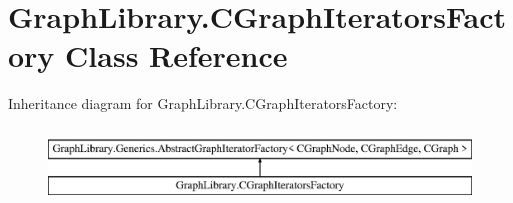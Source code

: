 \hypertarget{class_graph_library_1_1_c_graph_iterators_factory}{}\section{Graph\+Library.\+C\+Graph\+Iterators\+Factory Class Reference}
\label{class_graph_library_1_1_c_graph_iterators_factory}
Inheritance diagram for Graph\+Library.\+C\+Graph\+Iterators\+Factory\+:\begin{figure}[H]
\begin{center}
\leavevmode
\includegraphics[height=2.000000cm]{class_graph_library_1_1_c_graph_iterators_factory}
\end{center}
\end{figure}
